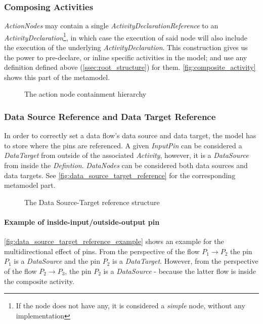 \subsubsection*{Composing Activities}\label{ssec:composing-activities}

\emph{ActionNodes} may contain a single \emph{ActivityDeclarationReference} to an \emph{ActivityDeclaration}\footnote{If the node does not have any, it is considered a \emph{simple} node, without any implementation}, in which case the execution of said node will also include the execution of the underlying \emph{ActivityDeclaration}. This construction gives us the power to pre-declare, or inline specific activities in the model; and use any definition defined above (\autoref{ssec:root_structure})  for them. \autoref{fig:composite_activity} shows this part of the metamodel.

\begin{figure}[!ht]
	\centering
	
	\caption{The action node containment hierarchy}
	\label{fig:composite_activity}
\end{figure}

\subsubsection*{Data Source Reference and Data Target Reference}\label{ssec:data-reference}

In order to correctly set a data flow's data source and data target, the model has to store where the pins are referenced. A given \emph{InputPin} can be considered a \emph{DataTarget} from outside of the associated \emph{Activity}, however, it is a \emph{DataSource} from inside the \emph{Defintion}. \emph{DataNodes} can be considered both data sources and data targets. See \autoref{fig:data_source_target_reference} for the corresponding metamodel part.

\begin{figure}[!ht]
	\centering
	
	\caption{The Data Source-Target reference structure}
	\label{fig:data_source_target_reference}
\end{figure}

\paragraph{Example of inside-input/outside-output pin} \autoref{fig:data_source_target_reference_example} shows an example for the multidirectional effect of pins. From the perspective of the flow \(P_1 \rightarrow P_2\) the pin \(P_1\) is a \emph{DataSource} and the pin \(P_2\) is a \emph{DataTarget}. However, from the perspective of the flow \(P_2 \rightarrow P_3\), the pin \(P_2\) is a \emph{DataSource} - because the latter flow is inside the composite activity.

